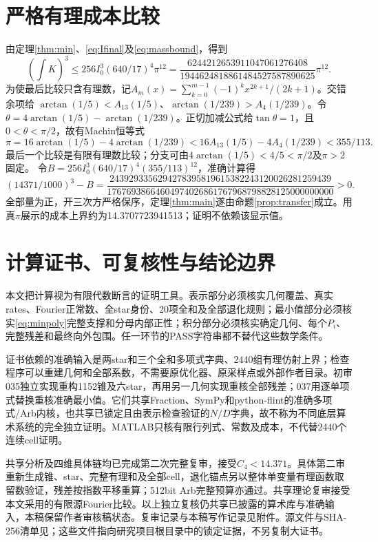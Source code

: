 \documentclass[UTF8,11pt,a4paper,fontset=fandol]{ctexart}
\theoremstyle{remark}\newtheorem{remark}[theorem]{注}
\newcommand{\1}{\mathbf1}\newcommand{\pos}[1]{(#1)_+}
\begin{document}
\section{严格有理成本比较}
由定理\ref{thm:min}、\eqref{eq:Ifinal}及\eqref{eq:massbound}，得到
\[
 (\int K)^3\le256I_0^3(640/17)^4\pi^{12}
 =\frac{6244212653911047061276408}{1944624818861484527587890625}\pi^{12}.
\]
为使最后比较只含有理数，记$A_m(x)=\sum_{k=0}^{m-1}(-1)^kx^{2k+1}/(2k+1)$。交错余项给
$\arctan(1/5)<A_{13}(1/5)$、$\arctan(1/239)>A_4(1/239)$。令$\theta=4\arctan(1/5)-\arctan(1/239)$。正切加减公式给$\tan\theta=1$，且$0<\theta<\pi/2$，故有Machin恒等式
\[
 \pi=16\arctan(1/5)-4\arctan(1/239)
 <16A_{13}(1/5)-4A_4(1/239)<355/113.
\]
最后一个比较是有限有理数比较；分支可由$4\arctan(1/5)<4/5<\pi/2$及$\pi>2$固定。
令$B=256I_0^3(640/17)^4(355/113)^{12}$，准确计算得
\[
 (14371/1000)^3-B=
 \frac{2439293356294278395819615382243120026281259439}
 {17676938664604974026861767968798828125000000000}>0.
\]
全部量为正，开三次方严格保序，定理\ref{thm:main}遂由命题\ref{prop:transfer}成立。用真$\pi$展示的成本上界约为14.3707723941513；证明不依赖该显示值。

\section{计算证书、可复核性与结论边界}
本文把计算视为有限代数断言的证明工具。表示部分必须核实几何覆盖、真实rates、Fourier正常数、全star身份、20项全和及全部退化规则；最小值部分必须核实\eqref{eq:minpoly}完整支撑和分母内部正性；积分部分必须核实确定几何、每个$P_i$、完整残差和最终向外包围。任一环节的PASS字符串都不替代这些数学条件。

证书依赖的准确输入是两star和三个全和多项式字典、2440组有理仿射上界；检查程序可以重建几何和全部系数，不需要原优化器、原采样点或外部作者目录。初审035独立实现重构1152锥及六star，再用另一几何实现重核全部残差；037用逐单项式替换重核准确最小值。它们共享Fraction、SymPy和python-flint的准确多项式/Arb内核，也共享已锁定且由表示检查验证的$N/D$字典，故不称为不同底层算术系统的完全独立证明。MATLAB只核有限行列式、常数及成本，不代替2440个连续cell证明。

共享分析及四维具体链均已完成第二次完整复审，接受$C_4<14.371$。具体第二审重新生成锥、star、完整有理和及全部cell，退化锚点另以整体单变量有理函数取留数验证，残差按指数平移重算；512bit Arb完整预算亦通过。共享理论复审接受本文采用的有限源Fourier比较。以上独立复核仍共享已披露的算术库与准确输入，本稿保留作者审核稿状态。复审记录与本稿写作记录见附件。源文件与SHA-256清单见；这些文件指向研究项目根目录中的锁定证据，不另复制大证书。
\end{document}
